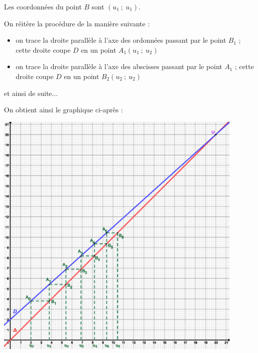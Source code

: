 \begin{corrige}
\begin{enumerate}
          Les coordonnées du point $B$ sont $(u_1~;~u_1)$.
          \par
          On réitère la procédure de la manière suivante :
          \par
          \begin{itemize}
               \item
               on trace la droite parallèle à l'axe des ordonnées passant par le point $B_1$ ; cette droite coupe $D$ en un point $A_1(u_1~;~u_2)$
               \item
               on trace la droite parallèle à l'axe des abscisses passant par le point  $A_1$ ; cette droite coupe $D$ en un point $B_2(u_2~;~u_2)$
               \par
          \end{itemize}
          \par
          et ainsi de suite...
          \par
          On obtient ainsi le graphique ci-après :
          \begin{center}
               \begin{extern}%
                    \includegraphics[width=0.9\textwidth]{images/BBESL-s3-2-2.eps}%
               \end{extern}
          \end{center}
          \begin{center}

\end{center}
\end{enumerate}
\end{corrige}
